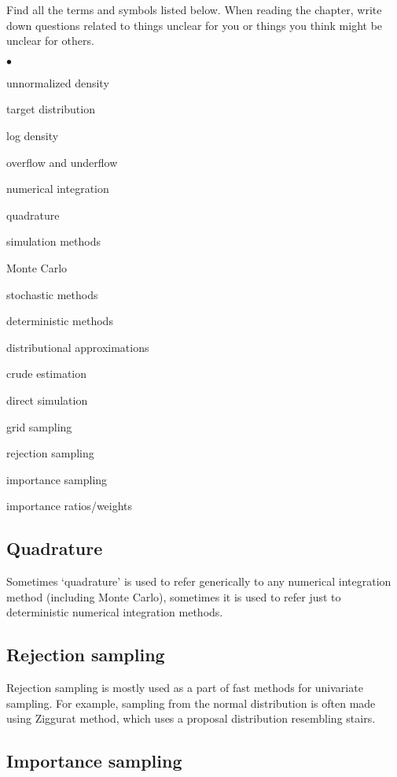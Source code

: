 \documentclass[a4paper,11pt,english]{article}
\begin{document}
Find all the terms and symbols listed below. When reading the chapter,
write down questions related to things unclear for you or things you
think might be unclear for others. 
\begin{list}{$\bullet$}{\parsep=0pt\itemsep=2pt}
\item unnormalized density
\item target distribution
\item log density
\item overflow and underflow
\item numerical integration
\item quadrature
\item simulation methods
\item Monte Carlo
\item stochastic methods
\item deterministic methods
\item distributional approximations
\item crude estimation
\item direct simulation
\item grid sampling
\item rejection sampling
\item importance sampling
\item importance ratios/weights
\end{list}

 \subsection*{Quadrature}

 Sometimes `quadrature' is used to refer generically to any numerical
 integration method (including Monte Carlo), sometimes it is used to
 refer just to deterministic numerical integration methods.

 \subsection*{Rejection sampling}

 Rejection sampling is mostly used as a part of fast methods for
 univariate sampling. For example, sampling from the normal
 distribution is often made using Ziggurat method, which uses a
 proposal distribution resembling stairs.

 \subsection*{Importance sampling}
\end{document}
